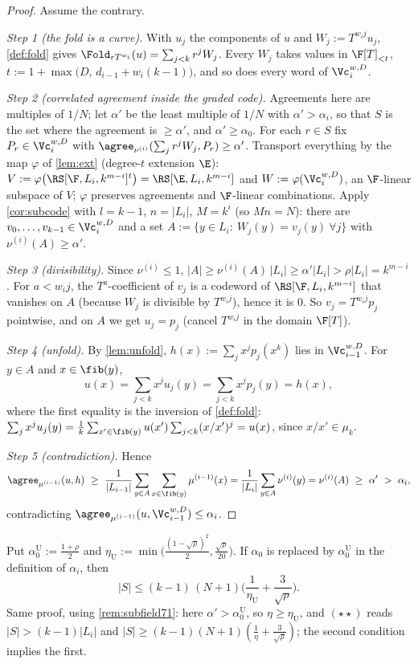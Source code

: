 \begin{proof}
Assume the contrary.

\emph{Step 1 (the fold is a curve).} With $u_j$ the components of $u$ and
$W_j:=T^{w_ij}u_j$, \cref{def:fold} gives $\Fold_{rT^{w_i}}(u)=\sum_{j<k}r^jW_j$. Every
$W_j$ takes values in $\F[T]_{<t}$, $t:=1+\max\big(D,\,d_{i-1}+w_i(k-1)\big)$, and so does
every word of $\Vc_i^{w,D}$.

\emph{Step 2 (correlated agreement inside the graded code).} Agreements here are
multiples of $1/N$; let $\alpha'$ be the least multiple of $1/N$ with $\alpha'>\alpha_i$, so
that $S$ is the set where the agreement is $\ge\alpha'$, and $\alpha'\ge\alpha_0$. For each
$r\in S$ fix $P_r\in\Vc_i^{w,D}$ with $\agree_{\nu^{(i)}}(\sum_jr^jW_j,P_r)\ge\alpha'$.
Transport everything by the map $\varphi$ of \cref{lem:ext} (degree-$t$ extension $\E$):
$V:=\varphi\big(\RS[\F,L_i,k^{m-i}]^t\big)=\RS[\E,L_i,k^{m-i}]$ and
$W:=\varphi(\Vc_i^{w,D})$, an $\F$-linear subspace of $V$; $\varphi$ preserves agreements and
$\F$-linear combinations. Apply \cref{cor:subcode} with $l=k-1$, $n=|L_i|$,
$M=k^i$ (so $Mn=N$): there are $v_0,\dots,v_{k-1}\in\Vc_i^{w,D}$ and a set
$A:=\{y\in L_i:\ W_j(y)=v_j(y)\ \forall j\}$ with $\nu^{(i)}(A)\ge\alpha'$.

\emph{Step 3 (divisibility).} Since $\nu^{(i)}\le1$,
$|A|\ge\nu^{(i)}(A)\,|L_i|\ge\alpha'|L_i|>\rho|L_i|=k^{m-i}$. For $a<w_ij$, the
$T^a$-coefficient of $v_j$ is a codeword of $\RS[\F,L_i,k^{m-i}]$ that vanishes on $A$
(because $W_j$ is divisible by $T^{w_ij}$), hence it is $0$. So $v_j=T^{w_ij}p_j$
pointwise, and on $A$ we get $u_j=p_j$ (cancel $T^{w_ij}$ in the domain $\F[T]$).

\emph{Step 4 (unfold).} By \cref{lem:unfold}, $h(x):=\sum_jx^jp_j(x^k)$ lies in
$\Vc_{i-1}^{w,D}$. For $y\in A$ and $x\in\fib(y)$,
\[
u(x)=\sum_{j<k}x^ju_j(y)=\sum_{j<k}x^jp_j(y)=h(x),
\]
where the first equality is the inversion of \cref{def:fold}:
$\sum_jx^ju_j(y)=\frac1k\sum_{x'\in\fib(y)}u(x')\sum_{j<k}(x/x')^j=u(x)$, since
$x/x'\in\mu_k$.

\emph{Step 5 (contradiction).} Hence
\[
\agree_{\mu^{(i-1)}}(u,h)\ \ge\ \frac1{|L_{i-1}|}\sum_{y\in A}\sum_{x\in\fib(y)}\mu^{(i-1)}(x)
=\frac1{|L_i|}\sum_{y\in A}\nu^{(i)}(y)=\nu^{(i)}(A)\ \ge\ \alpha'\ >\ \alpha_i ,
\]
contradicting $\agree_{\mu^{(i-1)}}(u,\Vc_{i-1}^{w,D})\le\alpha_i$.
\end{proof}

\begin{remark}\label{rem:round-ud}
Put $\alpha^{\mathrm U}_0:=\frac{1+\rho}2$ and
$\eta_{\mathrm U}:=\min\big(\frac{(1-\sqrt\rho)^2}2,\frac{\sqrt\rho}{20}\big)$. If
$\alpha_0$ is replaced by $\alpha^{\mathrm U}_0$ in the definition of $\alpha_i$, then
\[
|S|\le(k-1)\,(N+1)\Big(\frac1{\eta_{\mathrm U}}+\frac3{\sqrt\rho}\Big).
\]
Same proof, using \cref{rem:subfield71}: here $\alpha'>\alpha^{\mathrm U}_0$, so
$\eta\ge\eta_{\mathrm U}$, and $(\star\star)$ reads $|S|>(k-1)|L_i|$ and
$|S|\ge(k-1)(N+1)(\frac1\eta+\frac3{\sqrt\rho})$; the second condition implies the first.
\end{remark}
